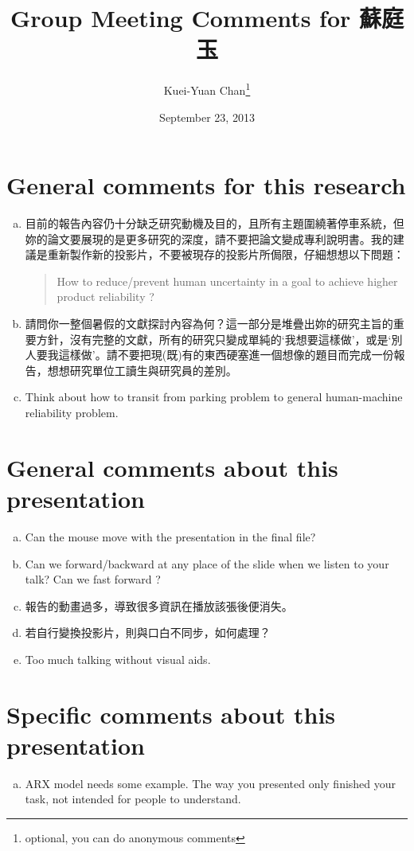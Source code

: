 \documentclass[12pt,a4paper]{article}
\begin{document}
\begin{CJK}{UTF8}{bkai} %
\title{ Group Meeting Comments for 蘇庭玉}
\date{September 23, 2013}
\author{Kuei-Yuan Chan\footnote{optional, you can do anonymous comments}}

\maketitle

\section{General comments for this research}
\begin{enumerate}[(a)]
\item 目前的報告內容仍十分缺乏研究動機及目的，且所有主題圍繞著停車系統，但妳的論文要展現的是更多研究的深度，請不要把論文變成專利說明書。我的建議是重新製作新的投影片，不要被現存的投影片所侷限，仔細想想以下問題：
\begin{quote}
How to reduce/prevent human uncertainty in a goal to achieve higher product reliability ? 
\end{quote}
\item 請問你一整個暑假的文獻探討內容為何？這一部分是堆疊出妳的研究主旨的重要方針，沒有完整的文獻，所有的研究只變成單純的`我想要這樣做'，或是`別人要我這樣做'。請不要把現(既)有的東西硬塞進一個想像的題目而完成一份報告，想想研究單位工讀生與研究員的差別。
\item Think about how to transit from parking problem to general human-machine reliability problem.
\end{enumerate}

\section{General comments about this presentation}
\begin{enumerate}[(a)]
\item Can the mouse move with the presentation in the final file?
\item Can we forward/backward at any place of the slide when we listen to your talk? Can we fast forward ?
\item 報告的動畫過多，導致很多資訊在播放該張後便消失。
\item 若自行變換投影片，則與口白不同步，如何處理？
\item Too much talking without visual aids.
\end{enumerate}

\section{Specific comments about this presentation}
\begin{enumerate}[(a)]
\item ARX model needs some example. The way you presented only finished your task, not intended for people to understand.
\end{enumerate}

\end{CJK} %
\end{document}
